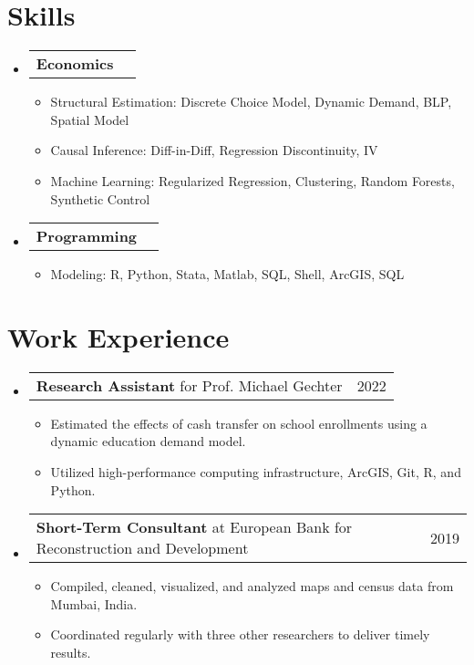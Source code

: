 \documentclass[letterpaper,10pt]{article}
\makeatletter
\newcommand{\resumeItem}[1]{
  \item\small{
    {#1 \vspace{-2pt}}
  }
}
\newcommand{\resumeSubSubheading}[2]{
    \item
    \begin{tabular*}{0.97\textwidth}{l@{\extracolsep{\fill}}r}
      \small#1 & \small #2 \\
    \end{tabular*}\vspace{-7pt}
}
\newcommand{\resumeSubHeadingListStart}{\begin{itemize}[leftmargin=0.15in, label={}]}
\newcommand{\resumeSubHeadingListEnd}{\end{itemize}}
\newcommand{\resumeItemListStart}{\begin{itemize}}
\newcommand{\resumeItemListEnd}{\end{itemize}\vspace{-5pt}}
\makeatother
\begin{document}
\section{Skills}

    \resumeSubHeadingListStart

    \resumeSubSubheading{\textbf{Economics}}{}
    \resumeItemListStart
      \resumeItem{Structural Estimation: Discrete Choice Model, Dynamic Demand, BLP, Spatial Model}
      \resumeItem{Causal Inference: Diff-in-Diff, Regression Discontinuity, IV }
      \resumeItem{Machine Learning: Regularized Regression, Clustering, Random Forests, Synthetic Control}
    \resumeItemListEnd

    \resumeSubSubheading{\textbf{Programming} }{}
      \resumeItemListStart
      \resumeItem{Modeling: R, Python, Stata, Matlab, SQL, Shell, ArcGIS, SQL}
    \resumeItemListEnd

    \resumeSubHeadingListEnd

\section{Work Experience} %
\label{sec:working_experience}

\resumeSubHeadingListStart

    \resumeSubSubheading
    {\textbf{Research Assistant} for Prof. Michael Gechter}{2022}
    \resumeItemListStart
        \resumeItem{Estimated the effects of cash transfer on school enrollments using a dynamic education demand model.}
        \resumeItem{Utilized high-performance computing infrastructure, ArcGIS, Git, R, and Python. }
    \resumeItemListEnd    
    \resumeSubSubheading
    {\textbf{Short-Term Consultant} at European Bank for Reconstruction and Development}{2019}
    \resumeItemListStart
        \resumeItem{Compiled, cleaned, visualized, and analyzed maps and census data from Mumbai, India.}
        \resumeItem{Coordinated regularly with three other researchers to deliver timely results.}
    \resumeItemListEnd
    
\resumeSubHeadingListEnd
\end{document}
